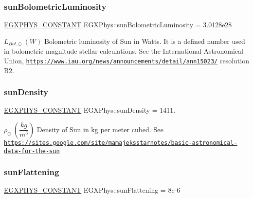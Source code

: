\subsubsection{\texorpdfstring{sun\+Bolometric\+Luminosity}{sunBolometricLuminosity}}
{\footnotesize\ttfamily \mbox{\hyperlink{group___e_g_x_phys-_constants-_macros_ga76980d288494ce1714c9ac68a95ba702}{E\+G\+X\+P\+H\+Y\+S\+\_\+\+C\+O\+N\+S\+T\+A\+NT}} E\+G\+X\+Phys\+::sun\+Bolometric\+Luminosity = 3.\+0128e28}

$L_{Bol,\odot} \ (W)$ Bolometric luminosity of Sun in Watts. It is a defined number used in bolometric magnitude stellar calculations. See the International Astronomical Union, \href{https://www.iau.org/news/announcements/detail/ann15023/}{\tt https\+://www.\+iau.\+org/news/announcements/detail/ann15023/} resolution B2. \mbox{\label{group___e_g_x_phys-_constants-_astrophysics-_solar_system-_sun-_bulk_gacee8979e95c926008206cc47c4cdc809}} 
\subsubsection{\texorpdfstring{sun\+Density}{sunDensity}}
{\footnotesize\ttfamily \mbox{\hyperlink{group___e_g_x_phys-_constants-_macros_ga76980d288494ce1714c9ac68a95ba702}{E\+G\+X\+P\+H\+Y\+S\+\_\+\+C\+O\+N\+S\+T\+A\+NT}} E\+G\+X\+Phys\+::sun\+Density = 1411.}

$\rho_{\odot} \ (\dfrac{kg}{m^3})$ Density of Sun in kg per meter cubed. See \href{https://sites.google.com/site/mamajeksstarnotes/basic-astronomical-data-for-the-sun}{\tt https\+://sites.\+google.\+com/site/mamajeksstarnotes/basic-\/astronomical-\/data-\/for-\/the-\/sun} \mbox{\label{group___e_g_x_phys-_constants-_astrophysics-_solar_system-_sun-_bulk_ga4487692a8eaf3f3eec0aae769eefcabb}} 
\subsubsection{\texorpdfstring{sun\+Flattening}{sunFlattening}}
{\footnotesize\ttfamily \mbox{\hyperlink{group___e_g_x_phys-_constants-_macros_ga76980d288494ce1714c9ac68a95ba702}{E\+G\+X\+P\+H\+Y\+S\+\_\+\+C\+O\+N\+S\+T\+A\+NT}} E\+G\+X\+Phys\+::sun\+Flattening = 8e-\/6}

